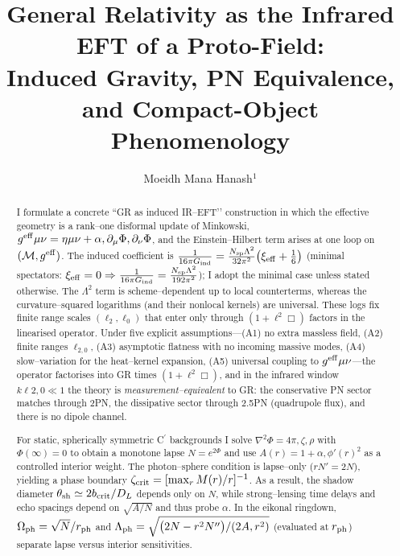 \documentclass{iopjournal}
\begin{document}

\title{General Relativity as the Infrared EFT of a Proto-Field:\\ Induced Gravity, PN Equivalence, and Compact-Object Phenomenology}

\author{Moeidh Mana Hanash$^1$}




\begin{abstract}
I formulate a concrete ``GR as induced IR–EFT’’ construction in which the effective geometry is a rank–one disformal update of Minkowski,
$g^{\rm eff}{\mu\nu}=\eta{\mu\nu}+\alpha,\partial_\mu\Phi,\partial_\nu\Phi$,
and the Einstein–Hilbert term arises at one loop on $(\mathcal M,g^{\rm eff})$. The induced coefficient is
$\frac{1}{16\pi G_{\rm ind}}=\frac{N_{\rm sp}\Lambda^2}{32\pi^2}\big(\xi_{\rm eff}+\frac{1}{6}\big)$
(minimal spectators: $\xi_{\rm eff}=0\Rightarrow\frac{1}{16\pi G_{\rm ind}}=\frac{N_{\rm sp}\Lambda^2}{192\pi^2}$); I adopt the minimal case unless stated otherwise. The $\Lambda^2$ term is scheme–dependent up to local counterterms, whereas the curvature–squared logarithms (and their nonlocal kernels) are universal. These logs fix finite range scales $(\ell_2,\ell_0)$ that enter only through $(1+\ell^2\Box)$ factors in the linearised operator. Under five explicit assumptions—(A1) no extra massless field, (A2) finite ranges $\ell_{2,0}$, (A3) asymptotic flatness with no incoming massive modes, (A4) slow–variation for the heat–kernel expansion, (A5) universal coupling to $g^{\rm eff}{\mu\nu}$—the operator factorises into GR times $(1+\ell^2\Box)$, and in the infrared window $k\ell{2,0}\ll1$ the theory is \emph{measurement–equivalent} to GR: the conservative PN sector matches through 2PN, the dissipative sector through 2.5PN (quadrupole flux), and there is no dipole channel.

For static, spherically symmetric C$^\prime$ backgrounds I solve $\nabla^2\Phi=4\pi,\zeta,\rho$ with $\Phi(\infty)=0$ to obtain a monotone lapse $N=e^{2\Phi}$ and use $A(r)=1+\alpha,\phi'(r)^{2}$ as a controlled interior weight. The photon–sphere condition is lapse–only ($rN'=2N$), yielding a phase boundary $\zeta_{\rm crit}=[\max_r M(r)/r]^{-1}$. As a result, the shadow diameter $\theta_{\rm sh}\simeq 2b_{\rm crit}/D_L$ depends only on $N$, while strong–lensing time delays and echo spacings depend on $\sqrt{A/N}$ and thus probe $\alpha$. In the eikonal ringdown, $\Omega_{\rm ph}=\sqrt{N}/r_{\rm ph}$ and $\Lambda_{\rm ph}=\sqrt{\big(2N-r^{2}N''\big)/(2A,r^{2})}$ (evaluated at $r_{\rm ph}$) separate lapse versus interior sensitivities.



\end{abstract}
\end{document}
